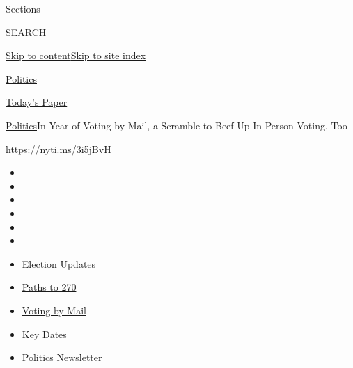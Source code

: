 Sections

SEARCH

\protect\hyperlink{site-content}{Skip to
content}\protect\hyperlink{site-index}{Skip to site index}

\href{https://www.nytimes3xbfgragh.onion/section/politics}{Politics}

\href{https://myaccount.nytimes3xbfgragh.onion/auth/login?response_type=cookie\&client_id=vi}{}

\href{https://www.nytimes3xbfgragh.onion/section/todayspaper}{Today's
Paper}

\href{/section/politics}{Politics}\textbar{}In Year of Voting by Mail, a
Scramble to Beef Up In-Person Voting, Too

\url{https://nyti.ms/3i5jBvH}

\begin{itemize}
\item
\item
\item
\item
\item
\item
\end{itemize}

\begin{itemize}
\item
  \href{https://www.nytimes3xbfgragh.onion/live/2020/09/08/us/trump-vs-biden?action=click\&pgtype=Article\&state=default\&region=TOP_BANNER\&context=storylines_menu}{Election
  Updates}
\item
  \href{https://www.nytimes3xbfgragh.onion/interactive/2020/us/elections/election-states-biden-trump.html?action=click\&pgtype=Article\&state=default\&region=TOP_BANNER\&context=storylines_menu}{Paths
  to 270}
\item
  \href{https://www.nytimes3xbfgragh.onion/interactive/2020/08/31/us/politics/vote-by-mail-deadlines.html?action=click\&pgtype=Article\&state=default\&region=TOP_BANNER\&context=storylines_menu}{Voting
  by Mail}
\item
  \href{https://www.nytimes3xbfgragh.onion/interactive/2019/us/elections/2020-presidential-election-calendar.html?action=click\&pgtype=Article\&state=default\&region=TOP_BANNER\&context=storylines_menu}{Key
  Dates}
\item
  \href{https://www.nytimes3xbfgragh.onion/newsletters/politics?action=click\&pgtype=Article\&state=default\&region=TOP_BANNER\&context=storylines_menu}{Politics
  Newsletter}
\end{itemize}


